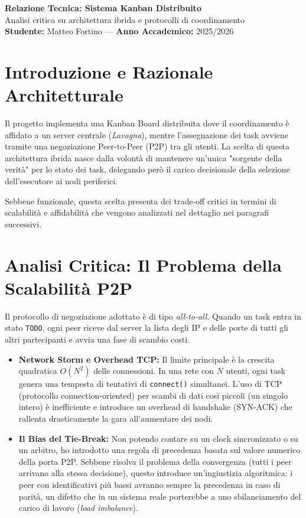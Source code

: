 \documentclass[a4paper,11pt]{article}
\begin{document}
\begin{center}
    {\huge \textbf{Relazione Tecnica: Sistema Kanban Distribuito}} \\
    \vspace{2mm}
    {\large Analisi critica su architettura ibrida e protocolli di coordinamento} \\
    \vspace{5mm}
    \textbf{Studente:} Matteo Fortino --- \textbf{Anno Accademico:} 2025/2026
\end{center}

\section{Introduzione e Razionale Architetturale}
Il progetto implementa una Kanban Board distribuita dove il coordinamento è affidato a un server centrale (\textit{Lavagna}), mentre l'assegnazione dei task avviene tramite una negoziazione Peer-to-Peer (P2P) tra gli utenti. La scelta di questa architettura ibrida nasce dalla volontà di mantenere un'unica "sorgente della verità" per lo stato dei task, delegando però il carico decisionale della selezione dell'esecutore ai nodi periferici. 

Sebbene funzionale, questa scelta presenta dei trade-off critici in termini di scalabilità e affidabilità che vengono analizzati nel dettaglio nei paragrafi successivi.

\section{Analisi Critica: Il Problema della Scalabilità P2P}
Il protocollo di negoziazione adottato è di tipo \textit{all-to-all}. Quando un task entra in stato \texttt{TODO}, ogni peer riceve dal server la lista degli IP e delle porte di tutti gli altri partecipanti e avvia una fase di scambio costi.

\begin{itemize}[leftmargin=*]
    \item \textbf{Network Storm e Overhead TCP:} Il limite principale è la crescita quadratica $O(N^2)$ delle connessioni. In una rete con $N$ utenti, ogni task genera una tempesta di tentativi di \texttt{connect()} simultanei. L'uso di TCP (protocollo connection-oriented) per scambi di dati così piccoli (un singolo intero) è inefficiente e introduce un overhead di handshake (SYN-ACK) che rallenta drasticamente la gara all'aumentare dei nodi.
    \item \textbf{Il Bias del Tie-Break:} Non potendo contare su un clock sincronizzato o su un arbitro, ho introdotto una regola di precedenza basata sul valore numerico della porta P2P. Sebbene risolva il problema della convergenza (tutti i peer arrivano alla stessa decisione), questo introduce un'ingiustizia algoritmica: i peer con identificativi più bassi avranno sempre la precedenza in caso di parità, un difetto che in un sistema reale porterebbe a uno sbilanciamento del carico di lavoro (\textit{load imbalance}).
\end{itemize}
\end{document}
